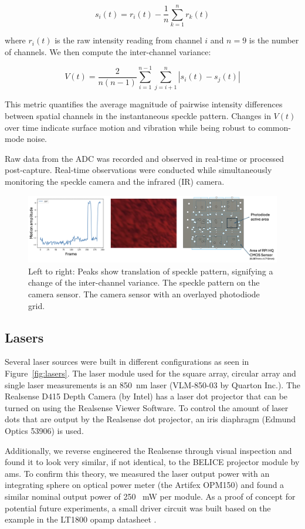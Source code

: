 \begin{equation}
s_i(t) = r_i(t) - \frac{1}{n}\sum_{k=1}^{n} r_k(t)
\end{equation}

where $r_i(t)$ is the raw intensity reading from channel $i$ and $n=9$ is the number of channels. We then compute the inter-channel variance:

\begin{equation}
V(t) = \frac{2}{n(n-1)} \sum_{i=1}^{n-1} \sum_{j=i+1}^{n} |s_i(t) - s_j(t)|
\end{equation}

This metric quantifies the average magnitude of pairwise intensity differences between spatial channels in the instantaneous speckle pattern. 
Changes in $V(t)$ over time indicate surface motion and vibration while being robust to common-mode noise.

Raw data from the ADC was recorded and observed in real-time or processed post-capture. 
Real-time observations were conducted while simultaneously monitoring the speckle camera and the infrared (IR) camera.

\begin{figure}[t]
  \centering
  \includegraphics[width=\textwidth]{figures/impl/emulated2.png}
  \caption{Left to right: Peaks show translation of speckle pattern, signifying a change of the inter-channel variance. The speckle pattern on the camera sensor. The camera sensor with an overlayed photodiode grid.}
  \label{fig:emulated2}
\end{figure}

\subsection{Lasers}

Several laser sources were built in different configurations as seen in Figure~\ref{fig:lasers}. 
The laser module used for the square array, circular array and single laser measurements is an 850~nm laser (VLM-850-03 by Quarton Inc.).
The Realsense D415 Depth Camera (by Intel) has a laser dot projector that can be turned on using the Realsense Viewer Software. 
To control the amount of laser dots that are output by the Realsense dot projector, an iris diaphragm (Edmund Optics 53906) is used.

Additionally, we reverse engineered the Realsense through visual inspection and found it to look very similar, if not identical, to the BELICE projector module by ams. 
To confirm this theory, we measured the laser output power with an integrating sphere on optical power meter (the Artifex OPM150) and found a similar nominal output power of 250 ~mW per module.
As a proof of concept for potential future experiments, a small driver circuit was built based on the example in the LT1800 opamp datasheet \cite{lt1800}. 